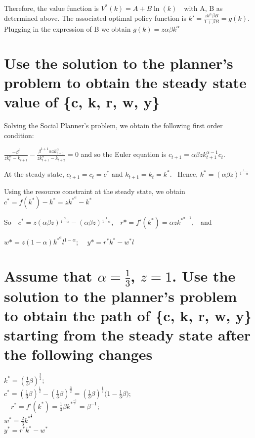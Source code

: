 \documentclass[12pt,a4paper]{article}
\begin{document}
Therefore, the value function is $V^*(k)=A+B \ln(k)$~~with A, B
as determined above. The associated optimal policy function is $k'=\frac{zk^\alpha\beta B}{1+\beta B}=g(k)$. Plugging in the expression of B we obtain $g(k)=z\alpha \beta k^\alpha $

\section{Use the solution to the planner’s problem to obtain the steady state value of \{c, k, r, w, y\}}

Solving the Social Planner's problem, we obtain the following first order condition:

$\frac{-\beta^{t}}{zk^{\alpha}_{t}-k_{t+1}}-\frac{\beta^{t+1} \alpha zk^{\alpha}_{t+1}}{zk^{\alpha}_{t+1}-k_{t+2}}=0$  and so the Euler equation is $c_{t+1}=\alpha \beta z k_{t+1}^{\alpha-1} c_{t}$.

At the steady state, $c_{t+1}=c_{t}=c^*$ and $k_{t+1}=k_{t}=k^*$. ~Hence, $k^*=(\alpha \beta z)^{\frac{1}{1-\alpha}}$

Using the resource constraint at the steady state, we obtain $c^*=f(k^*)-k^*=zk^{*^{\alpha}}-k^*$ 

So~~$c^*=z(\alpha \beta z)^{\frac{\alpha}{1-\alpha}}-(\alpha \beta z)^{\frac{1}{1-\alpha}}$,~~$r*=f'(k^*)=\alpha zk^{*^{\alpha-1}}$,~~and

$w*=z(1-\alpha)k^{*^{\alpha}}l^{1-\alpha}$; ~~$y*=r^*k^*-w^{*}l$

\section{ Assume that  $\alpha=\frac{1}{3}$, $z = 1$. Use the solution to the planner’s problem to obtain the path of \{c, k, r, w, y\} starting from the steady state after the following changes}

$k^*=(\frac{1}{3}\beta )^{\frac{3}{2}}$;~~\\
$c^*=(\frac{1}{3}\beta )^{\frac{1}{2}}-(\frac{1}{3}\beta )^{\frac{3}{2}}=(\frac{1}{3}\beta )^{\frac{1}{2}}\big(1-\frac{1}{3}\beta\big)$;\\ ~~$r^*=f'(k^*)=\frac{1}{3}\beta k^{*^{\frac{-2}{3}}}=\beta^{-1}$;  \\
$w^*=\frac{2}{3}k^{*^{\frac{1}{3}}}$\\
$y^*=r^*k^*-w^{*}$
\end{document}
